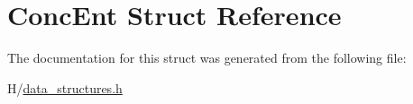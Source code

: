\hypertarget{structConcEnt}{
\section{ConcEnt Struct Reference}
\label{structConcEnt}
}


The documentation for this struct was generated from the following file:\begin{DoxyCompactItemize}
\item 
H/\hyperlink{data__structures_8h}{data\_\-structures.h}\end{DoxyCompactItemize}
